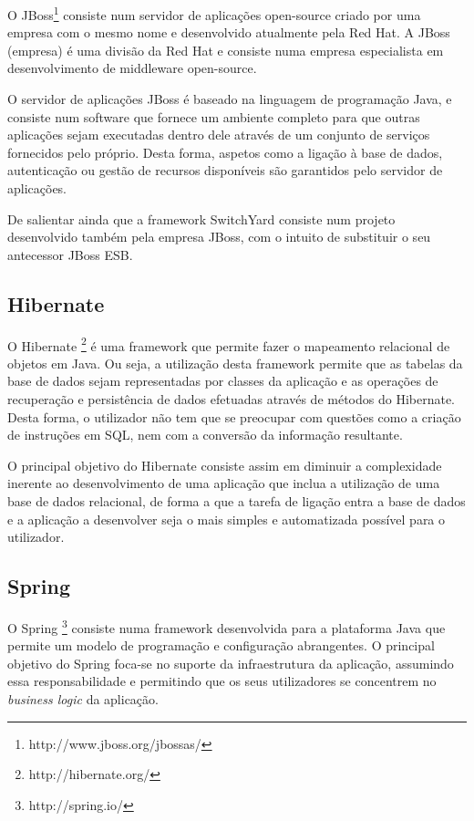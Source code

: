 O JBoss\footnote{http://www.jboss.org/jbossas/} consiste num servidor de aplicações open-source criado por uma empresa com o mesmo nome e desenvolvido atualmente pela Red Hat. A JBoss (empresa) é uma divisão da Red Hat e consiste numa empresa especialista em desenvolvimento de middleware open-source.

O servidor de aplicações JBoss é baseado na linguagem de programação Java, e consiste num software que fornece um ambiente completo para que outras aplicações sejam executadas dentro dele através de um conjunto de serviços fornecidos pelo próprio. Desta forma, aspetos como a ligação à base de dados, autenticação ou gestão de recursos disponíveis são garantidos pelo servidor de aplicações. 

De salientar ainda que a framework SwitchYard consiste num projeto desenvolvido também pela empresa JBoss, com o intuito de substituir o seu antecessor JBoss ESB.

\subsection{Hibernate }

O Hibernate \footnote{http://hibernate.org/} é uma framework que permite fazer o mapeamento relacional de objetos em Java. Ou seja, a utilização desta framework permite que as tabelas da base de dados sejam representadas por classes da aplicação e as operações de recuperação e persistência de dados efetuadas através de métodos do Hibernate. Desta forma, o utilizador não tem que se preocupar com questões como a criação de instruções em SQL, nem com a conversão da informação resultante.

O principal objetivo do Hibernate consiste assim em diminuir a complexidade inerente ao desenvolvimento de uma aplicação que inclua a utilização de uma base de dados relacional, de forma a que a tarefa de ligação entra a base de dados e a aplicação a desenvolver seja o mais simples e automatizada possível para o utilizador.


\subsection{Spring}

O Spring \footnote{http://spring.io/} consiste numa framework desenvolvida para a plataforma Java que permite um modelo de programação e configuração abrangentes. O principal objetivo do Spring foca-se no suporte da infraestrutura da aplicação, assumindo essa responsabilidade e permitindo que os seus utilizadores se concentrem no \textit{business logic} da aplicação.

